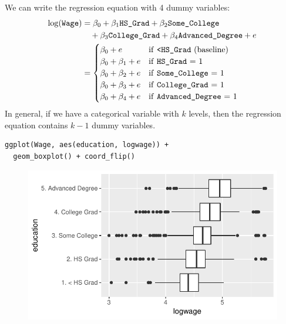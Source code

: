 \documentclass[10pt]{beamer}\usepackage[]{graphicx}\usepackage[]{color}
\begin{document}
\begin{frame}
We can write the regression equation with 4 dummy variables:
\begin{align*}
\log(\texttt{Wage}) &= \beta_0 + \beta_1 \texttt{HS\_Grad} + \beta_2 \texttt{Some\_College}\\ 
& \quad + \beta_3 \texttt{College\_Grad} + \beta_4 \texttt{Advanced\_Degree} + e\\
& = \begin{cases}
\beta_0 + e & \text{if  \texttt{<HS\_Grad} (baseline)}\\
\beta_0 + \beta_1 + e & \text{if \texttt{HS\_Grad}  = 1}\\
\beta_0 + \beta_2 + e & \text{if \texttt{Some\_College}  = 1}\\
\beta_0 + \beta_3 + e & \text{if \texttt{College\_Grad}  = 1}\\
\beta_0 + \beta_4 + e & \text{if \texttt{Advanced\_Degree}  = 1}
\end{cases}
\end{align*}
In general, if we have a categorical variable with $k$ levels, then the regression equation contains $k-1$ dummy variables. 
\end{frame}

\begin{frame}[fragile]
\small
\begin{verbatim}
ggplot(Wage, aes(education, logwage)) + 
  geom_boxplot() + coord_flip()
\end{verbatim}
\begin{figure}
\includegraphics[scale=0.7]{figure/educ_boxplots.pdf}
\end{figure}
\end{frame}
\end{document}
